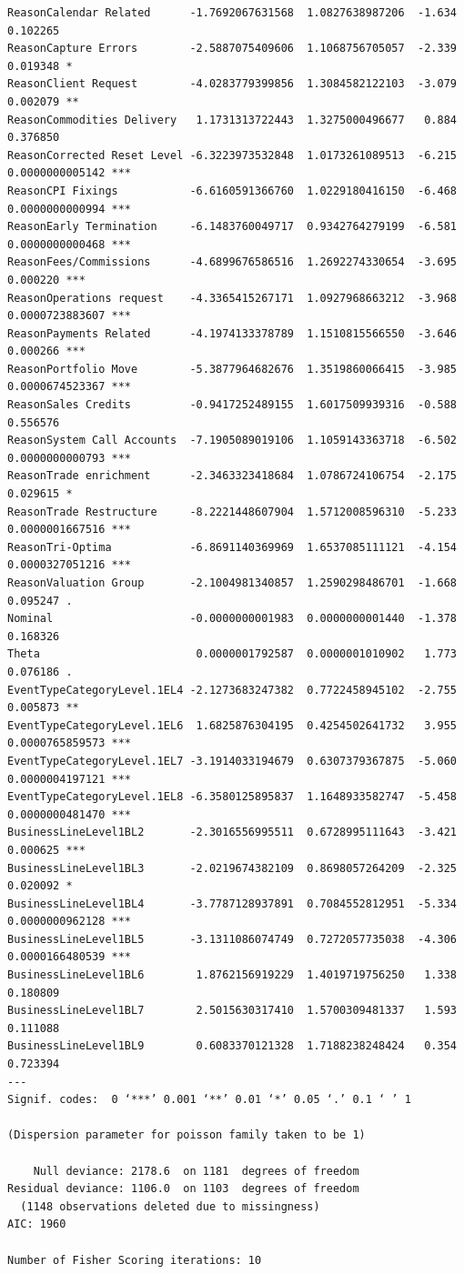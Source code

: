 \documentclass[a4paper]{article}
\begin{document}
\begin{verbatim}
ReasonCalendar Related      -1.7692067631568  1.0827638987206  -1.634        0.102265    
ReasonCapture Errors        -2.5887075409606  1.1068756705057  -2.339        0.019348 *  
ReasonClient Request        -4.0283779399856  1.3084582122103  -3.079        0.002079 ** 
ReasonCommodities Delivery   1.1731313722443  1.3275000496677   0.884        0.376850    
ReasonCorrected Reset Level -6.3223973532848  1.0173261089513  -6.215 0.0000000005142 ***
ReasonCPI Fixings           -6.6160591366760  1.0229180416150  -6.468 0.0000000000994 ***
ReasonEarly Termination     -6.1483760049717  0.9342764279199  -6.581 0.0000000000468 ***
ReasonFees/Commissions      -4.6899676586516  1.2692274330654  -3.695        0.000220 ***
ReasonOperations request    -4.3365415267171  1.0927968663212  -3.968 0.0000723883607 ***
ReasonPayments Related      -4.1974133378789  1.1510815566550  -3.646        0.000266 ***
ReasonPortfolio Move        -5.3877964682676  1.3519860066415  -3.985 0.0000674523367 ***
ReasonSales Credits         -0.9417252489155  1.6017509939316  -0.588        0.556576    
ReasonSystem Call Accounts  -7.1905089019106  1.1059143363718  -6.502 0.0000000000793 ***
ReasonTrade enrichment      -2.3463323418684  1.0786724106754  -2.175        0.029615 *  
ReasonTrade Restructure     -8.2221448607904  1.5712008596310  -5.233 0.0000001667516 ***
ReasonTri-Optima            -6.8691140369969  1.6537085111121  -4.154 0.0000327051216 ***
ReasonValuation Group       -2.1004981340857  1.2590298486701  -1.668        0.095247 .  
Nominal                     -0.0000000001983  0.0000000001440  -1.378        0.168326    
Theta                        0.0000001792587  0.0000001010902   1.773        0.076186 .  
EventTypeCategoryLevel.1EL4 -2.1273683247382  0.7722458945102  -2.755        0.005873 ** 
EventTypeCategoryLevel.1EL6  1.6825876304195  0.4254502641732   3.955 0.0000765859573 ***
EventTypeCategoryLevel.1EL7 -3.1914033194679  0.6307379367875  -5.060 0.0000004197121 ***
EventTypeCategoryLevel.1EL8 -6.3580125895837  1.1648933582747  -5.458 0.0000000481470 ***
BusinessLineLevel1BL2       -2.3016556995511  0.6728995111643  -3.421        0.000625 ***
BusinessLineLevel1BL3       -2.0219674382109  0.8698057264209  -2.325        0.020092 *  
BusinessLineLevel1BL4       -3.7787128937891  0.7084552812951  -5.334 0.0000000962128 ***
BusinessLineLevel1BL5       -3.1311086074749  0.7272057735038  -4.306 0.0000166480539 ***
BusinessLineLevel1BL6        1.8762156919229  1.4019719756250   1.338        0.180809    
BusinessLineLevel1BL7        2.5015630317410  1.5700309481337   1.593        0.111088    
BusinessLineLevel1BL9        0.6083370121328  1.7188238248424   0.354        0.723394    
---
Signif. codes:  0 ‘***’ 0.001 ‘**’ 0.01 ‘*’ 0.05 ‘.’ 0.1 ‘ ’ 1

(Dispersion parameter for poisson family taken to be 1)

    Null deviance: 2178.6  on 1181  degrees of freedom
Residual deviance: 1106.0  on 1103  degrees of freedom
  (1148 observations deleted due to missingness)
AIC: 1960

Number of Fisher Scoring iterations: 10
\end{verbatim}
\end{document}
